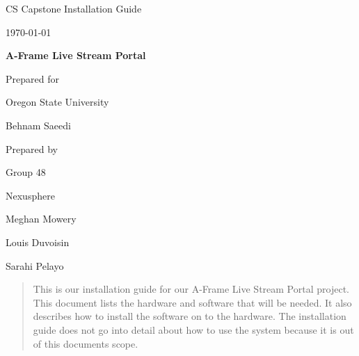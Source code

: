 \documentclass[onecolumn, draftclsnofoot,10pt, compsoc]{IEEEtran}
\def \CapstoneTeamName{		Nexusphere}
\def \CapstoneTeamNumber{		48}
\def \GroupMemberOne{			Meghan Mowery}
\def \GroupMemberTwo{			Louis Duvoisin}
\def \GroupMemberThree{			Sarahi Pelayo}
\def \CapstoneProjectName{		A-Frame Live Stream Portal}
\def \CapstoneSponsorCompany{	Oregon State University}
\def \CapstoneSponsorPerson{		Behnam Saeedi}
\def \DocType{		Installation Guide
				}
\begin{document}
\begin{titlepage}
    \begin{singlespace}
        \hfill 
        \par\vspace{.2in}
        \centering
        \scshape{
            \huge CS Capstone \DocType \par
            {\large\today}\par
            \vspace{.5in}
            \textbf{\Huge\CapstoneProjectName}\par
            \vfill
            {\large Prepared for}\par
            \Huge \CapstoneSponsorCompany\par
            \vspace{5pt}
            {\Large\CapstoneSponsorPerson\par}
            {\large Prepared by }\par
            Group\CapstoneTeamNumber\par
            \CapstoneTeamName\par 
            \vspace{5pt}
            {\Large
                \GroupMemberOne\par
                \GroupMemberTwo\par
                \GroupMemberThree\par
            }
            \vspace{20pt}
        }
        \begin{abstract}
        	This is our installation guide for our A-Frame Live Stream Portal project. This document lists the hardware and software that will be needed. It also describes how to install the software on to the hardware. The installation guide does not go into detail about how to use the system because it is out of this documents scope.
        \end{abstract}     
    \end{singlespace}
\end{titlepage}
\newpage
{}
\tableofcontents
\clearpage
\end{document}
